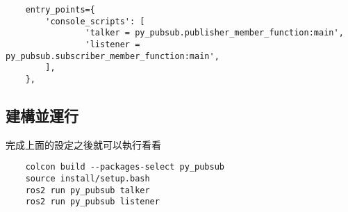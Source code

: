 \begin{verbatim}
    entry_points={
        'console_scripts': [
                'talker = py_pubsub.publisher_member_function:main',
                'listener = py_pubsub.subscriber_member_function:main',
        ],
    },
\end{verbatim}

\subsection{建構並運行}
完成上面的設定之後就可以執行看看
\begin{verbatim}
    colcon build --packages-select py_pubsub
    source install/setup.bash
    ros2 run py_pubsub talker
    ros2 run py_pubsub listener
\end{verbatim}

